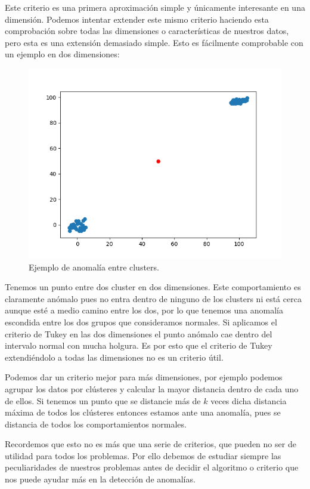 Este criterio es una primera aproximación simple y únicamente interesante en una dimensión. Podemos intentar extender este mismo criterio haciendo esta comprobación sobre todas las dimensiones o características de nuestros datos, pero esta es una extensión demasiado simple. Esto es fácilmente comprobable con un ejemplo en dos dimensiones:

\begin{figure}[H]
	\centering
	\includegraphics[scale=0.5]{imagenes/outlier_cluster.png}
	\caption{Ejemplo de anomalía entre clusters.}
	\label{img:outlier-cluster}
\end{figure}

Tenemos un punto entre dos cluster en dos dimensiones. Este comportamiento es claramente anómalo pues no entra dentro de ninguno de los clusters ni está cerca aunque esté a medio camino entre los dos, por lo que tenemos una anomalía escondida entre los dos grupos que consideramos normales. Si aplicamos el criterio de Tukey en las dos dimensiones el punto anómalo cae dentro del intervalo normal con mucha holgura. Es por esto que el criterio de Tukey extendiéndolo a todas las dimensiones no es un criterio útil.

Podemos dar un criterio mejor para más dimensiones, por ejemplo podemos agrupar los datos por clústeres y calcular la mayor distancia dentro de cada uno de ellos. Si tenemos un punto que se distancie más de $k$ veces dicha distancia máxima de todos los clústeres entonces estamos ante una anomalía, pues se distancia de todos los comportamientos normales.

Recordemos que esto no es más que una serie de criterios, que pueden no ser de utilidad para todos los problemas. Por ello debemos de estudiar siempre las peculiaridades de nuestros problemas antes de decidir el algoritmo o criterio que nos puede ayudar más en la detección de anomalías.

